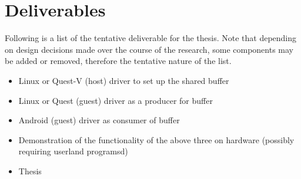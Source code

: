 \documentclass[12pt]{article}
\begin{document}
\section{Deliverables}
Following is a list of the tentative deliverable for the thesis. Note that depending on design decisions made over the course of the research, some components may be added or removed, therefore the tentative nature of the list.

\begin{itemize}
	\item Linux or Quest-V (host) driver to set up the shared buffer
	\item Linux or Quest (guest) driver as a producer for buffer
	\item Android (guest) driver as consumer of buffer
	\item Demonstration of the functionality of the above three on hardware (possibly requiring userland programsd)
	\item Thesis
\end{itemize}
\end{document}
